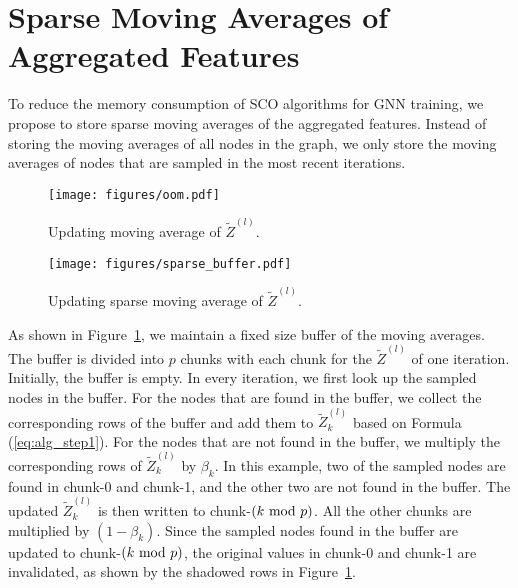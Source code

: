 \section{Sparse Moving Averages of Aggregated Features}
To reduce the memory consumption of SCO algorithms for GNN training, we propose to store sparse moving averages of the aggregated features. 
Instead of storing the moving averages of all nodes in the graph, we only store the moving averages of nodes that are sampled in the most recent iterations. 

\begin{figure}
  \begin{minipage}{.44\linewidth}
    \centering
  \texttt{[image: figures/oom.pdf]}
  \caption{Updating moving average of $\widetilde{Z}^{(l)}$.}
  \label{fig:oom}
\end{minipage} 
\hfill
\begin{minipage}{.52\linewidth}
  \centering
    \texttt{[image: figures/sparse\_buffer.pdf]}
    \caption{Updating sparse moving average of $\widetilde{Z}^{(l)}$.}
    \label{fig:sparse_buffer}
\end{minipage}
\end{figure}
As shown in Figure~\ref{fig:sparse_buffer}, we maintain a fixed size buffer of the moving averages. 
The buffer is divided into $p$ chunks with each chunk for the $\widetilde{Z}^{(l)}$ of one iteration. 
Initially, the buffer is empty. 
In every iteration, we first look up the sampled nodes in the buffer. 
For the nodes that are found in the buffer, we collect the corresponding rows of the buffer and add them to $\widetilde{Z}_k^{(l)}$ based on Formula (\ref{eq:alg_step1}). 
For the nodes that are not found in the buffer, we multiply the corresponding rows of $\widetilde{Z}_k^{(l)}$ by $\beta_k$. 
In this example, two of the sampled nodes are found in chunk-0 and chunk-1, and the other two are not found in the buffer. 
The updated $\widetilde{Z}_k^{(l)}$ is then written to chunk-$(k\ \mathrm{mod}\ p)$.  
All the other chunks are multiplied by $(1-\beta_k)$. 
Since the sampled nodes found in the buffer are updated to chunk-$(k\ \mathrm{mod}\ p)$, the original values in chunk-0 and chunk-1 are invalidated, as shown by the shadowed rows in Figure~\ref{fig:sparse_buffer}. 


